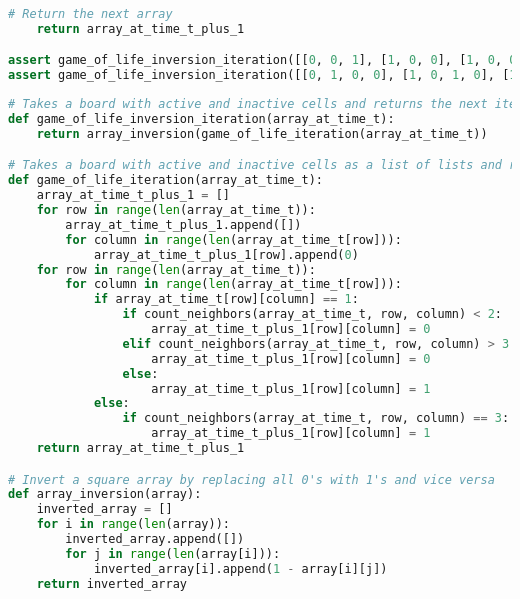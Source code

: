 \begin{figure*}[h]
\begin{lstlisting}[language=Python]
    # Return the next array
    return array_at_time_t_plus_1

assert game_of_life_inversion_iteration([[0, 0, 1], [1, 0, 0], [1, 0, 0]]) == [[1, 1, 1], [1, 0, 1], [1, 1, 1]]
assert game_of_life_inversion_iteration([[0, 1, 0, 0], [1, 0, 1, 0], [1, 0, 0, 1], [0, 1, 1, 0]]) == [[1, 0, 1, 1], [0, 1, 0, 1], [0, 1, 1, 0], [1, 0, 0, 1]]
\end{lstlisting}
\caption{Compilation of the program taking Conway's game of life \citep{games1970fantastic} and returning the next state, with the values inverted. In this case, we use automatic decomposition to generate the two subfunctions of \lstinline{game_of_life_iteration}.}
\label{pygameoflife}
\end{figure*}

\begin{figure*}[h]
\begin{lstlisting}[language=Python]
# Takes a board with active and inactive cells and returns the next iteration of the game of life, but with all the values flipped
def game_of_life_inversion_iteration(array_at_time_t):
    return array_inversion(game_of_life_iteration(array_at_time_t))

# Takes a board with active and inactive cells as a list of lists and returns the next iteration of the game of life
def game_of_life_iteration(array_at_time_t):
    array_at_time_t_plus_1 = []
    for row in range(len(array_at_time_t)):
        array_at_time_t_plus_1.append([])
        for column in range(len(array_at_time_t[row])):
            array_at_time_t_plus_1[row].append(0)
    for row in range(len(array_at_time_t)):
        for column in range(len(array_at_time_t[row])):
            if array_at_time_t[row][column] == 1:
                if count_neighbors(array_at_time_t, row, column) < 2:
                    array_at_time_t_plus_1[row][column] = 0
                elif count_neighbors(array_at_time_t, row, column) > 3:
                    array_at_time_t_plus_1[row][column] = 0
                else:
                    array_at_time_t_plus_1[row][column] = 1
            else:
                if count_neighbors(array_at_time_t, row, column) == 3:
                    array_at_time_t_plus_1[row][column] = 1
    return array_at_time_t_plus_1

# Invert a square array by replacing all 0's with 1's and vice versa
def array_inversion(array):
    inverted_array = []
    for i in range(len(array)):
        inverted_array.append([])
        for j in range(len(array[i])):
            inverted_array[i].append(1 - array[i][j])
    return inverted_array


\end{lstlisting}
\end{figure*}
